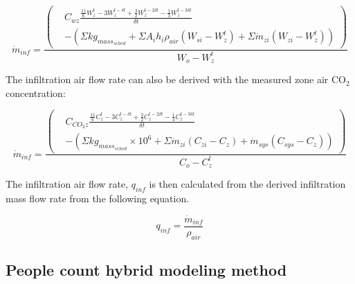 \begin{equation}
\dot{m}_{inf} = \frac{\left(\begin{aligned}& C_{wz}\frac {\frac{11}{6}W_{z}^{t}-3W_{z}^{t-\delta t}+\frac{3}{2}W_{z}^{t-2\delta t}-\frac{1}{3}W_{z}^{t-3\delta t}} {\delta t}\\ & - \left(\Sigma{kg_{mass_{sched}}} + \Sigma{A_i h_i \rho_{air} (W_{si} - W_{z}^{t})} + \Sigma{\dot{m}_{zi} (W_{zi}-W_{z}^{t})}\right)\end{aligned}\right)} {W_o - W_{z}^{t}}
\end{equation}

The infiltration air flow rate can also be derived with the measured zone air CO$_2$ concentration:

\begin{equation}
\dot{m}_{inf} = \frac{\left(\begin{aligned}& C_{CO_{2}z}\frac {\frac{11}{6}C_{z}^{t}-3C_{z}^{t-\delta t}+\frac{3}{2}C_{z}^{t-2\delta t}-\frac{1}{3}C_{z}^{t-3\delta t}} {\delta t}\\ & - \left(\Sigma{kg_{mass_{sched}}}\times 10^{6} + \Sigma{\dot{m}_{zi}(C_{zi}-C_z)} + \dot{m}_{sys} (C_{sys} - C_z)\right)\end{aligned}\right)} {C_o - C_{z}^{t}}
\end{equation}


The infiltration air flow rate, $q_{inf}$ is then calculated from the derived infiltration mass flow rate from the following equation.

\begin{equation}
q_{inf}= \frac {\dot{m}_{inf}} {ρ_{air}}
\end{equation}



\subsection{People count hybrid modeling method}\label{People count hybrid modeling method}

